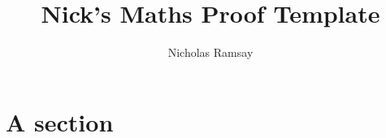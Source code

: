 \documentclass{article}
\title{\vspace{-3cm}\textbf{Nick's Maths Proof Template}} %
\author{Nicholas Ramsay}
\date{} %
\begin{document}
\maketitle

\section*{A section}
\end{document}
